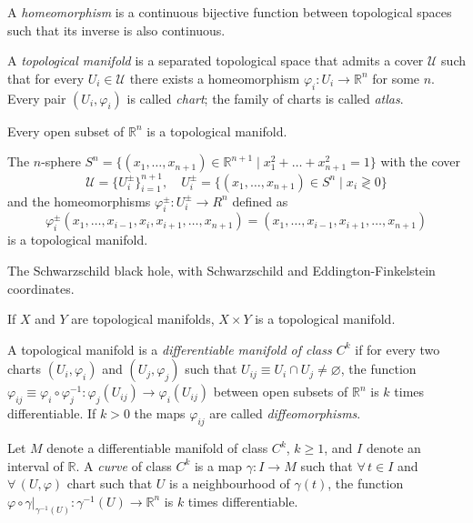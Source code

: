\documentclass[a4paper,12pt]{book}
\begin{document}
\begin{definition}
A \emph{homeomorphism} is a continuous bijective function between topological spaces such that its inverse is also continuous.
\end{definition}

\begin{definition}
A \emph{topological manifold} is a separated topological space that admits a cover $\mathcal U$ such that for every $U_i\in\mathcal U$ there exists a homeomorphism $\varphi_i\colon U_i\to\mathbb{R}^n$ for some $n$. Every pair $(U_i,\varphi_i)$ is called \emph{chart}; the family of charts is called \emph{atlas}.
\end{definition}

\begin{example}
Every open subset of $\mathbb R^n$ is a topological manifold.
\end{example}

\begin{example}
The $n$-sphere $S^n=\{(x_1,\ldots,x_{n+1})\in\mathbb{R}^{n+1}\mid x_1^2+\ldots+x_{n+1}^2=1\}$ with the cover
\[\mathcal U=\{U_i^\pm\}_{i=1}^{n+1},\quad U_i^\pm=\{(x_1,\ldots,x_{n+1})\in S^n\mid x_i\gtrless0\}\]
and the homeomorphisms $\varphi_i^\pm\colon U_i^\pm\to R^n$ defined as
\[\varphi_i^\pm(x_1,\ldots,x_{i-1},x_i,x_{i+1},\ldots,x_{n+1})=(x_1,\ldots,x_{i-1},x_{i+1},\ldots,x_{n+1})\]
is a topological manifold.
\end{example}

\begin{example}
The Schwarzschild black hole, with Schwarzschild and Eddington-Finkelstein coordinates.
\end{example}

\begin{example}
If $X$ and $Y$ are topological manifolds, $X\times Y$ is a topological manifold.
\end{example}

\begin{definition}
A topological manifold is a \emph{differentiable manifold of class $C^k$} if for every two charts $(U_i,\varphi_i)$ and $(U_j,\varphi_j)$ such that $U_{ij}\equiv U_i\cap U_j\ne\varnothing$, the function $\varphi_{ij}\equiv \varphi_i\circ\varphi_j^{-1}\colon\varphi_j(U_{ij})\to\varphi_i(U_{ij})$ between open subsets of $\mathbb R^n$ is $k$ times differentiable. If $k>0$ the maps $\varphi_{ij}$ are called \emph{diffeomorphisms}.
\end{definition}

\begin{definition}
Let $M$ denote a differentiable manifold of class $C^k$, $k\ge1$, and $I$ denote an interval of $\mathbb R$. A \emph{curve} of class $C^k$ is a map $\gamma\colon I\to M$ such that $\forall\, t\in I$ and $\forall\, (U,\varphi)$ chart such that $U$ is a neighbourhood of $\gamma(t)$, the function $\varphi\circ\gamma\big|_{\gamma^{-1}(U)}\colon \gamma^{-1}(U)\to \mathbb R^n$ is $k$ times differentiable.
\end{definition}
\end{document}
